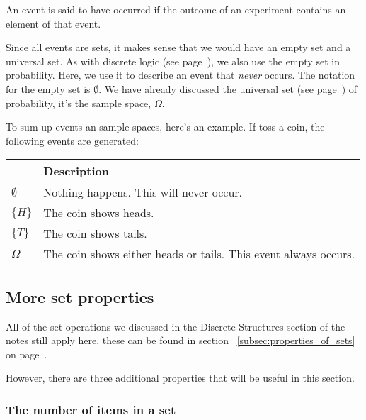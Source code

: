 An event is said to have occurred if the outcome of an experiment contains an
element of that event.

Since all events are sets, it makes sense that we would have an empty set and a
universal set. As with discrete logic (see page~\pageref{subsubsec:empty_set}),
we also use the empty set in probability. Here, we use it to describe an event
that {\it never} occurs. The notation for the empty set is $\emptyset$. We have
already discussed the universal set (see page~\pageref{subsubsec:universal_set})
of probability, it's the sample space, $\Omega$.


To sum up events an sample spaces, here's an example. If toss a coin, the
following events are generated:

\begin{center}
	\begin{tabular}{|>{\centering\arraybackslash}m{1cm}|m{8cm}|}
		\hline
		{\bf Event} & {\bf Description}\\ \hline
		$\emptyset$ & Nothing happens. This will never occur.\\ \hline
		$\{H\}$     & The coin shows heads.\\ \hline
		$\{T\}$     & The coin shows tails.\\ \hline
		$\Omega$    & The coin shows either heads or tails. This event always occurs.\\
		\hline
	\end{tabular}
\end{center}


\subsection{More set properties}

All of the set operations we discussed in the Discrete Structures section of the
notes still apply here, these can be found in section
~\ref{subsec:properties_of_sets} on page~\pageref{subsec:properties_of_sets}.

However, there are three additional properties that will be useful in this
section.

\subsubsection{The number of items in a set}

